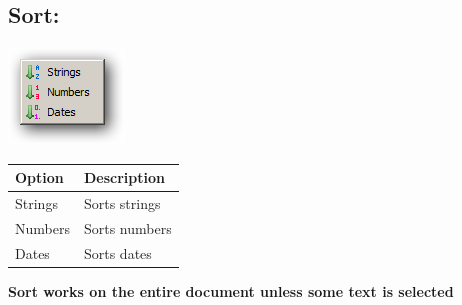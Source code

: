 \hypertarget{menu_tools_sort}{}
\subsection{Sort:}

\includegraphics[scale=0.50]{./res/menu_tools_sort.png}\\

\begin{scriptsize}\begin{tabularx}{\textwidth}{>{\hsize=0.3\hsize}X>{\hsize=0.7\hsize}X}\\
    \hline
    \textbf{Option} & \textbf{Description} \\
    \hline
    Strings & Sorts strings \\
    Numbers & Sorts numbers \\
    Dates & Sorts dates \\
    \hline
  \end{tabularx}\end{scriptsize}

\textbf{Sort works on the entire document unless some text is selected}
